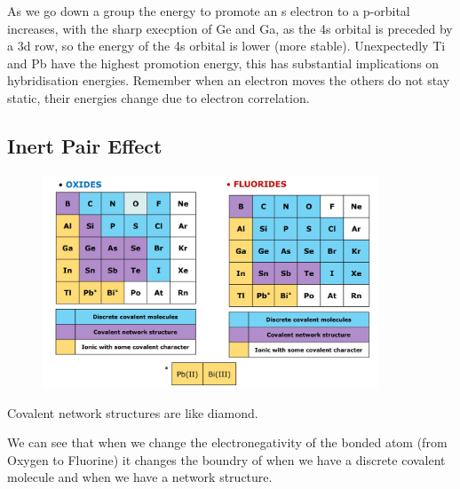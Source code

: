 \documentclass{article}
\newcommand{\NB}{{\large\lefthand}\quad}
\begin{document}
    As we go down a group the energy to promote an s electron to a p-orbital increases, with the sharp execption of 
    Ge and Ga, as the 4s orbital is preceded by a 3d row, so the energy of the 4s orbital is lower (more stable). 
    Unexpectedly Ti and Pb have the highest promotion energy, this has substantial implications on hybridisation
    energies. Remember when an electron moves the others do not stay static, their energies change due to
    electron correlation.
    \newpage
    \subsection{Inert Pair Effect}
    \begin{figure}[h]
        \centering
        \includegraphics[width=10cm]{of.jpg}
    \end{figure}
    \NB Covalent network structures are like diamond.

    We can see that when we change the electronegativity of the bonded atom (from Oxygen to Fluorine) it changes
    the boundry of when we have a discrete covalent molecule and when we have a network structure.

    
\end{document}
